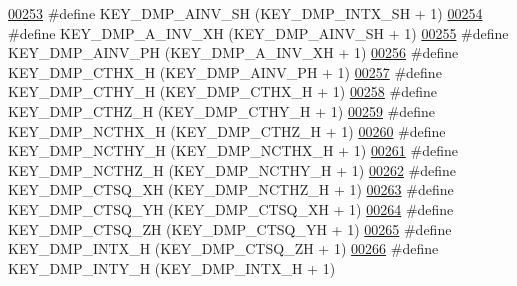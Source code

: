 \begin{DoxyCode}
\hypertarget{dmp_key_8h_source.tex_l00253}{}\hyperlink{dmp_key_8h_ab0149aeb858ec27aa149a76b56c403c2}{00253} \textcolor{preprocessor}{#define KEY\_DMP\_AINV\_SH             (KEY\_DMP\_INTX\_SH + 1)}
\hypertarget{dmp_key_8h_source.tex_l00254}{}\hyperlink{dmp_key_8h_a35c6bae9104e5181a35c6a808e7a65fc}{00254} \textcolor{preprocessor}{#define KEY\_DMP\_A\_INV\_XH            (KEY\_DMP\_AINV\_SH + 1)}
\hypertarget{dmp_key_8h_source.tex_l00255}{}\hyperlink{dmp_key_8h_a1e8e4cd27c89df79a58b09fec5b95f4c}{00255} \textcolor{preprocessor}{#define KEY\_DMP\_AINV\_PH             (KEY\_DMP\_A\_INV\_XH + 1)}
\hypertarget{dmp_key_8h_source.tex_l00256}{}\hyperlink{dmp_key_8h_a5848e728aacad5a425f4a5c3ed7a500f}{00256} \textcolor{preprocessor}{#define KEY\_DMP\_CTHX\_H              (KEY\_DMP\_AINV\_PH + 1)}
\hypertarget{dmp_key_8h_source.tex_l00257}{}\hyperlink{dmp_key_8h_a67b8ae62af92003fd452071b16d2fa20}{00257} \textcolor{preprocessor}{#define KEY\_DMP\_CTHY\_H              (KEY\_DMP\_CTHX\_H + 1)}
\hypertarget{dmp_key_8h_source.tex_l00258}{}\hyperlink{dmp_key_8h_a8a2add4a668b1d74ea608d9efc8bc137}{00258} \textcolor{preprocessor}{#define KEY\_DMP\_CTHZ\_H              (KEY\_DMP\_CTHY\_H + 1)}
\hypertarget{dmp_key_8h_source.tex_l00259}{}\hyperlink{dmp_key_8h_aad93cba2ac9fd2b0e5aa200c03fe5b0b}{00259} \textcolor{preprocessor}{#define KEY\_DMP\_NCTHX\_H             (KEY\_DMP\_CTHZ\_H + 1)}
\hypertarget{dmp_key_8h_source.tex_l00260}{}\hyperlink{dmp_key_8h_abdd6a4aba1149508cf939940d5ce1e25}{00260} \textcolor{preprocessor}{#define KEY\_DMP\_NCTHY\_H             (KEY\_DMP\_NCTHX\_H + 1)}
\hypertarget{dmp_key_8h_source.tex_l00261}{}\hyperlink{dmp_key_8h_a32c1477991a438d9c3c11465675bdc14}{00261} \textcolor{preprocessor}{#define KEY\_DMP\_NCTHZ\_H             (KEY\_DMP\_NCTHY\_H + 1)}
\hypertarget{dmp_key_8h_source.tex_l00262}{}\hyperlink{dmp_key_8h_ab61a9f07575290815a2bd193db7b56ab}{00262} \textcolor{preprocessor}{#define KEY\_DMP\_CTSQ\_XH             (KEY\_DMP\_NCTHZ\_H + 1)}
\hypertarget{dmp_key_8h_source.tex_l00263}{}\hyperlink{dmp_key_8h_a286ee2a5021630e3da18cca9dc15deb2}{00263} \textcolor{preprocessor}{#define KEY\_DMP\_CTSQ\_YH             (KEY\_DMP\_CTSQ\_XH + 1)}
\hypertarget{dmp_key_8h_source.tex_l00264}{}\hyperlink{dmp_key_8h_ac8c3e06a0141185c406f24af44f1a171}{00264} \textcolor{preprocessor}{#define KEY\_DMP\_CTSQ\_ZH             (KEY\_DMP\_CTSQ\_YH + 1)}
\hypertarget{dmp_key_8h_source.tex_l00265}{}\hyperlink{dmp_key_8h_a8dc9644f1f944bc9b737bc6fc5660a98}{00265} \textcolor{preprocessor}{#define KEY\_DMP\_INTX\_H              (KEY\_DMP\_CTSQ\_ZH + 1)}
\hypertarget{dmp_key_8h_source.tex_l00266}{}\hyperlink{dmp_key_8h_ad560e542748c0d1dbe4bc83e5fb91195}{00266} \textcolor{preprocessor}{#define KEY\_DMP\_INTY\_H              (KEY\_DMP\_INTX\_H + 1)}

\end{DoxyCode}
